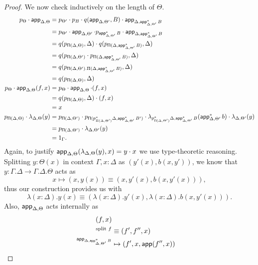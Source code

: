 \begin{proof}
  We now check inductively on the length of $\Theta$.
  \begin{align*}
    p_{\Theta}\cdot\operatorname{\mathsf{app}}_{\Delta,\Theta}
    &=p_{\Theta'}\cdot
    p_B\cdot
    q(\operatorname{\mathsf{app}}_{\Delta,\Theta'},B)\cdot
    \operatorname{\mathsf{app}}_{\Delta,\operatorname{\mathsf{app}}^*_{\Delta,\Theta'}B} \\
    &=p_{\Theta'}\cdot
    \operatorname{\mathsf{app}}_{\Delta,\Theta'}\cdot
    p_{\operatorname{\mathsf{app}}^*_{\Delta,\Theta'}B}\cdot
    \operatorname{\mathsf{app}}_{\Delta,\operatorname{\mathsf{app}}^*_{\Delta,\Theta'}B} \\
    &=q(p_{\operatorname{\mathsf{\Pi}}(\Delta,\Theta)},\Delta)\cdot
    q(p_{\operatorname{\mathsf{\Pi}}(\Delta,\operatorname{\mathsf{app}}^*_{\Delta,\Theta'}B)},\Delta) \\
    &=q(p_{\operatorname{\mathsf{\Pi}}(\Delta,\Theta')}\cdot
    p_{\operatorname{\mathsf{\Pi}}(\Delta,\operatorname{\mathsf{app}}^*_{\Delta,\Theta'}B)},\Delta) \\
    &=q(p_{\operatorname{\mathsf{\Pi}}(\Delta,\Theta').\Pi(\Delta,\operatorname{\mathsf{app}}^*_{\Delta,\Theta'}B)},\Delta) \\
    &=q(p_{\operatorname{\mathsf{\Pi}}(\Delta,\Theta)},\Delta) \\
    p_\Theta\cdot\operatorname{\mathsf{app}}_{\Delta,\Theta}(f,x)
    &=p_\Theta\cdot\operatorname{\mathsf{app}}_{\Delta,\Theta}\cdot(f,x) \\
    &=q(p_{\operatorname{\mathsf{\Pi}}(\Delta,\Theta)},\Delta)\cdot(f,x) \\
    &=x \\
    p_{\operatorname{\mathsf{\Pi}}(\Delta,\Theta)}\cdot
    \lambda_{\Delta,\Theta}(y)
    &=p_{\operatorname{\mathsf{\Pi}}(\Delta,\Theta')}\cdot
    p_{\operatorname{\mathsf{\Pi}}(p_{\Pi(\Delta,\Theta')}^*\Delta,\operatorname{\mathsf{app}}^*_{\Delta,\Theta'}B')}\cdot
    \lambda_{p^*_{\operatorname{\mathsf{\Pi}}(\Delta,\Theta')}\Delta,\operatorname{\mathsf{app}}^*_{\Delta,\Theta'}B}(\operatorname{\mathsf{app}}_{\Delta,\Theta'}^*b)\cdot
    \lambda_{\Delta,\Theta'}(y) \\
    &=p_{\operatorname{\mathsf{\Pi}}(\Delta,\Theta')}\cdot
    \lambda_{\Delta,\Theta'}(y) \\
    &=1_\Gamma.
  \end{align*}
  Again, to justify
  $\operatorname{\mathsf{app}}_{\Delta,\Theta}(\lambda_{\Delta,\Theta}(y),x)=y\cdot x$ we use
  type-theoretic reasoning.
  Splitting $y:\Theta(x)$ in context $\Gamma,x:\Delta$ as $(y'(x),b(x,y'))$, we
  know that $y\colon\Gamma.\Delta\rightarrow\Gamma.\Delta.\Theta$ acts as
  \[x\mapsto(x,y(x))\equiv(x,y'(x),b(x,y'(x))),\]
  thus our construction provides us with
  \[\lambda(x:\Delta).y(x)\equiv
  (\lambda(x:\Delta).y'(x),\lambda(x:\Delta).b(x,y'(x))).\]
  Also, $\operatorname{\mathsf{app}}_{\Delta,\Theta}$ acts internally as
  \begin{align*}
    (f,x) \\
    ^{\text{split }f}&\equiv(f',f'',x) \\
    ^{\app_{\Delta,\app^*_{\Delta,\Theta'}B}}&\mapsto(f',x,\app(f'',x)) \\

\end{align*}
\end{proof}
